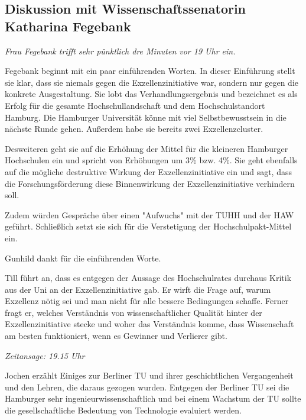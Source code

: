 \documentclass[ngerman,headheight=70pt]{scrartcl}
\begin{document}

    \subsection{Diskussion mit Wissenschaftssenatorin Katharina Fegebank}

    \textit{Frau Fegebank trifft sehr pünktlich dre Minuten vor 19 Uhr ein.}

    Fegebank beginnt mit ein paar einführenden Worten. In dieser Einführung
    stellt sie klar, dass sie niemals gegen die Exzellenzinitiative war, sondern
    nur gegen die konkrete Ausgestaltung. Sie lobt das Verhandlungsergebnis
    und bezeichnet es als Erfolg für die gesamte Hochschullandschaft und dem
    Hochschulstandort Hamburg. Die Hamburger Universität könne mit viel
    Selbstbewusstsein in die nächste Runde gehen. Außerdem habe sie bereits
    zwei Exzellenzcluster.

    Desweiteren geht sie auf die Erhöhung der Mittel für die kleineren
    Hamburger Hochschulen ein und spricht von Erhöhungen um 3\% bzw. 4\%.
    Sie geht ebenfalls auf die mögliche destruktive Wirkung der Exzellenzinitiative
    ein und sagt, dass die Forschungsförderung diese Binnenwirkung der
    Exzellenzinitiative verhindern soll.

    Zudem würden Gespräche über einen "Aufwuchs" mit der TUHH und der HAW geführt.
    Schließlich setzt sie sich für die Verstetigung der Hochschulpakt-Mittel ein.

    Gunhild dankt für die einführenden Worte.

    Till führt an, dass es entgegen der Aussage des Hochschulrates durchaus
    Kritik aus der Uni an der Exzellenzinitiative gab. Er wirft die Frage auf,
    warum Exzellenz nötig sei und man nicht für alle bessere Bedingungen schaffe.
    Ferner fragt er, welches Verständnis von wissenschaftlicher Qualität hinter
    der Exzellenzinitiative stecke und woher das Verständnis komme, dass
    Wissenschaft am besten funktioniert, wenn es Gewinner und Verlierer gibt.

    \textit{Zeitansage: 19.15 Uhr}

    Jochen erzählt Einiges zur Berliner TU und ihrer geschichtlichen Vergangenheit
    und den Lehren, die daraus gezogen wurden. Entgegen der Berliner TU sei die
    Hamburger sehr ingenieurwissenschaftlich und bei einem Wachstum der TU sollte
    die gesellschaftliche Bedeutung von Technologie evaluiert werden.
\end{document}
